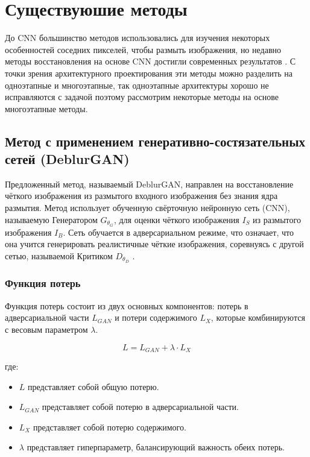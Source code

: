 \section{Существуюшие методы}

До CNN большинство методов использовались для изучения некоторых особенностей соседних пикселей, чтобы размыть изображения, но недавно методы восстановления на основе CNN достигли современных результатов \cite{suin2020spatially}. С точки зрения архитектурного проектирования эти методы можно разделить на одноэтапные и многоэтапные, так одноэтапные архитектуры хорошо не исправляются с задачой \cite{zamir2021multi} поэтому рассмотрим некоторые методы на основе многоэтапные методы.

\subsection{Метод с применением генеративно-состязательных сетей (DeblurGAN)}


Предложенный метод, называемый DeblurGAN, направлен на восстановление чёткого изображения из размытого входного изображения без знания ядра размытия. Метод использует обученную свёрточную нейронную сеть (CNN), называемую Генератором \(G_{\theta_{G}}\), для оценки чёткого изображения \(I_{S}\) из размытого изображения \(I_{B}\). Сеть обучается в адверсариальном режиме, что означает, что она учится генерировать реалистичные чёткие изображения, соревнуясь с другой сетью, называемой Критиком \(D_{\theta_{D}}\) \cite{kupyn2018deblurgan}.

\subsubsection*{Функция потерь}

Функция потерь состоит из двух основных компонентов: потерь в адверсариальной части \(L_{GAN}\) и потери содержимого \(L_{X}\), которые комбинируются с весовым параметром \(\lambda\).

\begin{equation}
	L = L_{GAN} + \lambda \cdot L_{X}
\end{equation}

где:
\begin{itemize}
	\item \(L\) представляет собой общую потерю.
	\item \(L_{GAN}\) представляет собой потерю в адверсариальной части.
	\item \(L_{X}\) представляет собой потерю содержимого.
	\item \(\lambda\) представляет гиперпараметр, балансирующий важность обеих потерь.
\end{itemize}

